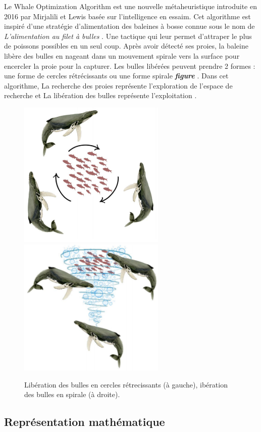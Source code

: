 \documentclass[12pt]{article}
\begin{document}
Le Whale Optimization Algorithm est une nouvelle métaheuristique introduite en 2016 par Mirjalili et Lewis basée sur l’intelligence en essaim. Cet algorithme est inspiré d’une stratégie d’alimentation des baleines à bosse connue sous le nom de \emph{L'alimentation au filet à bulles} . Une tactique qui leur permet d’attraper le plus de poissons possibles en un seul coup. Après avoir détecté ses proies, la baleine libère des bulles en nageant dans un mouvement spirale vers la surface pour encercler la proie pour la capturer.
Les bulles libérées peuvent prendre 2 formes : une forme de cercles rétrécissants ou une forme spirale \textbf{\emph{figure }}. 
Dans cet algorithme, La recherche des proies représente l’exploration de l’espace de recherche et La libération des bulles représente l’exploitation \cite{mirjalili2016whale}.
\begin{figure}[h!] 
    \includegraphics[width=7cm]{../figures/WOA/cercles.png}
    \includegraphics[width=7cm]{../figures/WOA/spiral.png}
    \caption{Libération des bulles en cercles rétrecissants (à gauche), ibération des bulles en spirale (à droite).}
    \label{fig:alimentation}
\end{figure}
\subsection{Représentation mathématique }
\end{document}
